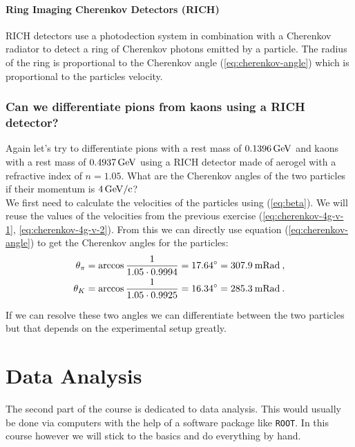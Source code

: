 \documentclass[10pt, titlepage, a4paper]{article}
\numberwithin{equation}{section}
\begin{document}
\paragraph{Ring Imaging Cherenkov Detectors (RICH)}
RICH detectors use a photodection system in combination with a Cherenkov radiator to detect a ring of Cherenkov photons emitted by 
a particle. The radius of the ring is proportional to the Cherenkov angle (\ref{eq:cherenkov-angle}) which is proportional to the 
particles velocity.
\subsubsection{Can we differentiate pions from kaons using a RICH detector?}
\label{sec:rich-pion-kaon}
Again let's try to differentiate pions with a rest mass of $0.1396\,\rm{GeV}$ and kaons with a rest mass of $0.4937\,\rm{GeV}$ using a RICH detector 
made of aerogel with a refractive index of $n=1.05$. What are the Cherenkov angles of the two particles if their momentum is $4\,\rm{GeV/c}$? \\

We first need to calculate the velocities of the particles using (\ref{eq:beta}). We will reuse the values of the velocities from the previous exercise
(\ref{eq:cherenkov-4g-v-1}, \ref{eq:cherenkov-4g-v-2}). From this we can directly use equation (\ref{eq:cherenkov-angle}) to get the Cherenkov angles for the particles:
%
\begin{align*}
    \theta_\pi = \arccos{\frac{1}{1.05\cdot 0.9994}} = 17.64^\circ = 307.9\>\rm{mRad}\>, \\
    \theta_K = \arccos{\frac{1}{1.05\cdot 0.9925}} = 16.34^\circ = 285.3\>\rm{mRad}\>.
\end{align*}

If we can resolve these two angles we can differentiate between the two particles but that depends on the experimental setup greatly.

\section{Data Analysis}
The second part of the course is dedicated to data analysis. This would usually be done via computers with the help of a 
software package like \texttt{ROOT}. In this course however we will stick to the basics and do everything by hand.
\end{document}
